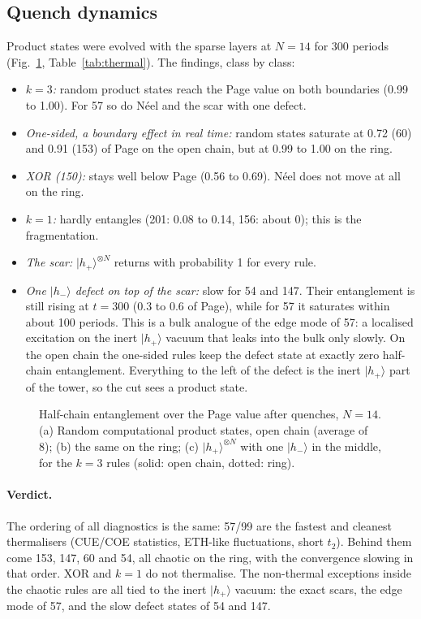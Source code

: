 \subsection{Quench dynamics}
Product states were evolved with the sparse layers at $N=14$ for 300 periods (Fig.~\ref{fig:dyn},
Table~\ref{tab:thermal}). The findings, class by class:
\begin{itemize}
\item \emph{$k=3$:} random product states reach the Page value on both boundaries (0.99 to 1.00). For 57 so do Néel and
  the scar with one defect.
\item \emph{One-sided, a boundary effect in real time:} random states saturate at 0.72 (60) and 0.91 (153) of Page on
  the open chain, but at 0.99 to 1.00 on the ring.
\item \emph{XOR (150):} stays well below Page (0.56 to 0.69). Néel does not move at all on the ring.
\item \emph{$k=1$:} hardly entangles (201: 0.08 to 0.14, 156: about 0); this is the fragmentation.
\item \emph{The scar:} $|h_+\rangle^{\otimes N}$ returns with probability 1 for every rule.
\item \emph{One $|h_-\rangle$ defect on top of the scar:} slow for 54 and 147. Their entanglement is still rising at
  $t=300$ (0.3 to 0.6 of Page), while for 57 it saturates within about 100 periods. This is a bulk analogue of the edge
  mode of 57: a localised excitation on the inert $|h_+\rangle$ vacuum that leaks into the bulk only slowly. On the open
  chain the one-sided rules keep the defect state at exactly zero half-chain entanglement. Everything to the left of the
  defect is the inert $|h_+\rangle$ part of the tower, so the cut sees a product state.
\end{itemize}

\begin{figure}[h]
\centering
{}
\caption{Half-chain entanglement over the Page value after quenches, $N=14$. (a) Random computational product states,
open chain (average of 8); (b) the same on the ring; (c) $|h_+\rangle^{\otimes N}$ with one $|h_-\rangle$ in the middle,
for the $k=3$ rules (solid: open chain, dotted: ring).}
\label{fig:dyn}
\end{figure}

\paragraph{Verdict.} The ordering of all diagnostics is the same: 57/99 are the fastest and cleanest thermalisers
(CUE/COE statistics, ETH-like fluctuations, short $t_2$). Behind them come 153, 147, 60 and 54, all chaotic on the
ring, with the convergence slowing in that order. XOR and $k=1$ do not thermalise. The non-thermal exceptions inside the
chaotic rules are all tied to the inert $|h_+\rangle$ vacuum: the exact scars, the edge mode of 57, and the slow defect
states of 54 and 147.
